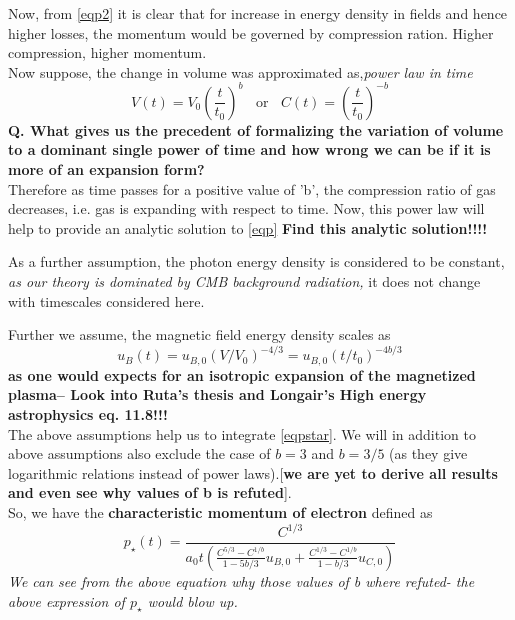 \documentclass[11pt]{report}
\newcommand{\tbf}[1]{\textbf{#1}}
\newcommand{\tit}[1]{\textit{#1}}
\newcommand{\cbox}{tcolorbox}
\newcommand{\cc}[1]{\left({#1}\right)}
\begin{document}
Now, from \eqref{eqp2} it is clear that for increase in energy density in fields and hence higher losses, the momentum would be governed by compression ration. Higher compression, higher momentum.\\


Now suppose, the change in volume was approximated as,\tit{power law in time}
\begin{equation}
V(t)=V_0\cc{\frac{t}{t_0}}^{b}\;\;\text{ or }\;\;C(t)=\cc{\frac{t}{t_0}}^{-b}
\end{equation}
\tbf{Q. What gives us the precedent of formalizing the variation of volume to a dominant single power of time and how wrong we can be if it is more of an expansion form?}\\

Therefore as time passes for a positive value of 'b', the compression ratio of gas decreases, i.e. gas is expanding with respect to time. Now, this power law will help to provide an analytic solution to \eqref{eqp} \tbf{Find this analytic solution!!!!}\\

\begin{\cbox}
As a further assumption, the photon energy density is considered to be constant, \tit{as our theory is dominated by CMB background radiation, } it does not change with timescales considered here.\\
\end{\cbox}
Further we assume, the magnetic field energy density scales as
\begin{equation}
u_B(t)=u_{B,0}(V/V_0)^{-4/3}=u_{B,0}(t/t_0)^{-4b/3}
\end{equation}
\tbf{as one would expects for an isotropic expansion of the magnetized plasma-- Look into Ruta's thesis and Longair's High energy astrophysics eq. 11.8!!!}\\


The above assumptions help us to integrate \eqref{eqpstar}. We will in addition to above assumptions also exclude the case of $b=3$ and $b=3/5$ (as they give logarithmic relations instead of power laws).[\tbf{we are yet to derive all results and even see why values of b is refuted}].\\

So, we have the \tbf{characteristic momentum of electron} defined as 
\begin{equation}
p_\star(t)=\frac{C^{1/3}}{a_0t\cc{\frac{C^{5/3}-C^{1/b}}{1-5b/3} u_{B,0}+\frac{C^{1/3}-C^{1/b}}{1-b/3} u_{C,0}}}
\end{equation}
\tit{We can see from the above equation why those values of b where refuted- the above expression of $p_\star$ would blow up.}\\
\end{document}
